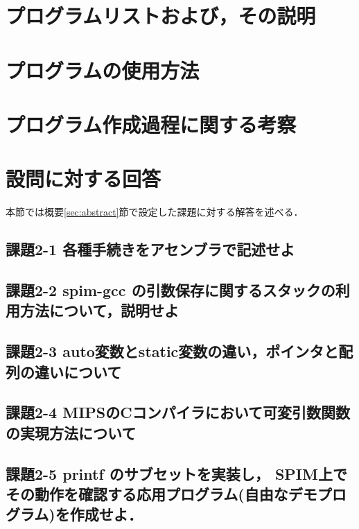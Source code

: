 \documentclass[11pt]{jarticle}
\begin{document}
\section{プログラムリストおよび，その説明}

\section{プログラムの使用方法}

\section{プログラム作成過程に関する考察}

\section{設問に対する回答}

本節では概要\ref{sec:abstract}節で設定した課題に対する解答を述べる．

\subsection{課題2-1 各種手続きをアセンブラで記述せよ}

\subsection{課題2-2 spim-gcc の引数保存に関するスタックの利用方法について，説明せよ}

\subsection{課題2-3 auto変数とstatic変数の違い，ポインタと配列の違いについて}

\subsection{課題2-4 MIPSのCコンパイラにおいて可変引数関数の実現方法について}

\subsection{課題2-5 printf のサブセットを実装し， SPIM上でその動作を確認する応用プログラム(自由なデモプログラム)を作成せよ．}
\end{document}
